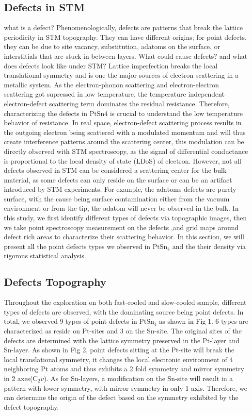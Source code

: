\subsection{Defects in STM}
what is a defect?
Phenomenologically, defects are patterns that break the lattice periodicity in STM topography. They can have different origins; for point defects, they can be due to site vacancy, substitution, adatoms on the surface, or interstitials that are stuck in between layers.
What could cause defects? and what does defects look like under STM?
Lattice imperfection breaks the local translational symmetry and is one the major sources of electron scattering in a metallic system. As the electron-phonon scattering and electron-electron scattering got supressed in low temperature, the temperature independent electron-defect scattering term dominates the residual resistance. Therefore, characterizing the defects in PtSn4 is crucial to understand the low temperature behavior of resistance. In real space, electron-defect scattering process results in the outgoing electron being scattered with a modulated momentum and will thus create interference patterns around the scattering center, this modulation can be directly observed with STM spectroscopy, as the signal of differential conductance is proportional to the local density of state (LDoS) of electron. 
However, not all defects observed in STM can be considered a scattering center for the bulk material, as some defects can only reside on the surface or can be an artifact introduced by STM experiments.  For example, the adatoms defects are purely surface, with the cause being surface contamination either from the vacuum environment or from the tip, the adatom will never be observed in the bulk. 
In this study, we first identify different types of defects via topographic images, then we take point spectroscopy measurement on the defects ,and grid maps around defect rich areas to characterize their scattering behavior. In this section, we will present all the point defects types we observed in PtSn$_4$ and the their density via rigorous statistical analysis. 

\subsection{Defects Topography}
Throughout the exploration on both fast-cooled and slow-cooled sample, different types of defects are observed, with the dominating source being point defects. In total, we observed 9 types of point defects in PtSn$_4$ as shown in Fig 1. 6 types are characterized as reside on Pt-sites and 3 on the Sn-site. The original sites of the defects are determined with the lattice symmetry preserved in the Pt-layer and Sn-layer. As shown in Fig 2, point defects sitting at the Pt-site will break the local translational symmetry, it changes the local electronic environment of 4 neighboring Pt atoms and thus exhibits a 2 fold symmetry and mirror symmetry in 2 axes(C$_2v$). As for Sn-layers, a modification on the Sn-site will result in a pattern with lower symmetry, with mirror symmetry in only 1 axis. Therefore, we can determine the origin of the defect based on the symmetry exhibited by the defect topography. 

